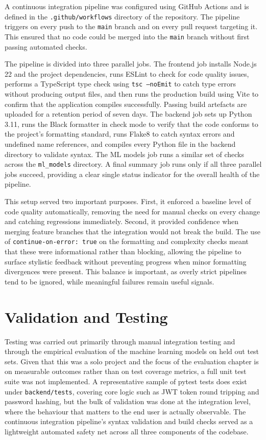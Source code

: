 A continuous integration pipeline was configured using GitHub Actions
\cite{githubactions2025} and is defined in the \texttt{.github/workflows}
directory of the repository. The pipeline triggers on every push to the \texttt{main} branch and on every pull request targeting it. This ensured that no code could be merged into the \texttt{main} branch without first passing automated checks.

The pipeline is divided into three parallel jobs. The frontend job
installs Node.js 22 and the project dependencies, runs ESLint to check
for code quality issues, performs a TypeScript type check using
\texttt{tsc --noEmit} to catch type errors without producing output files,
and then runs the production build using Vite \cite{vite2025} to confirm
that the application compiles successfully. Passing build artefacts are
uploaded for a retention period of seven days. The backend job sets up
Python 3.11, runs the Black formatter in check mode to verify that the
code conforms to the project's formatting standard, runs Flake8 to catch
syntax errors and undefined name references, and compiles every Python
file in the backend directory to validate syntax. The ML models job runs
a similar set of checks across the \texttt{ml\_models} directory. A final
summary job runs only if all three parallel jobs succeed, providing a
clear single status indicator for the overall health of the pipeline.

This setup served two important purposes. First, it enforced a baseline
level of code quality automatically, removing the need for manual checks
on every change and catching regressions immediately. Second, it provided
confidence when merging feature branches that the integration would not
break the build. The use of \texttt{continue-on-error: true} on the
formatting and complexity checks meant that these were informational
rather than blocking, allowing the pipeline to surface stylistic feedback
without preventing progress when minor formatting divergences were present. This balance is important, as overly strict pipelines tend to be ignored, while meaningful failures remain useful signals.

\section{Validation and Testing}

Testing was carried out primarily through manual integration testing and
through the empirical evaluation of the machine learning models on held
out test sets. Given that this was a solo project and the focus of the
evaluation chapter is on measurable outcomes rather than on test coverage
metrics, a full unit test suite was not implemented. A representative
sample of pytest tests does exist under \texttt{backend/tests}, covering
core logic such as JWT token round tripping and password hashing, but the
bulk of validation was done at the integration level, where the behaviour
that matters to the end user is actually observable. The continuous
integration pipeline's syntax validation and build checks served as a
lightweight automated safety net across all three components of the
codebase.

